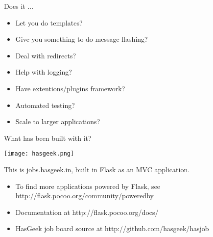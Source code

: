 \documentclass[xcolor=dvipsnames]{beamer}
\begin{document}
    \begin{frame}{Does it ...}
        \begin{itemize}
            \pause \item Let you do templates?
            \pause \item Give you something to do message flashing?
            \pause \item Deal with redirects?
            \pause \item Help with logging?
            \pause \item Have extentions/plugins framework?
            \pause \item Automated testing?
            \pause \item Scale to larger applications?
        \end{itemize}
    \end{frame}

    \begin{frame}{What has been built with it?}
        \begin{center}
	    \texttt{[image: hasgeek.png]}
	    \label{fig:hasgeek}
        \end{center}
        This is jobs.hasgeek.in, built in Flask as an MVC application.
    \end{frame}

    \begin{frame}
        \Large
        \begin{itemize}
            \item To find more applications powered by Flask, see http://flask.pocoo.org/community/poweredby
            \item Documentation at http://flask.pocoo.org/docs/
            \item HasGeek job board source at http://github.com/hasgeek/hasjob
        \end{itemize}
    \end{frame}
\end{document}
